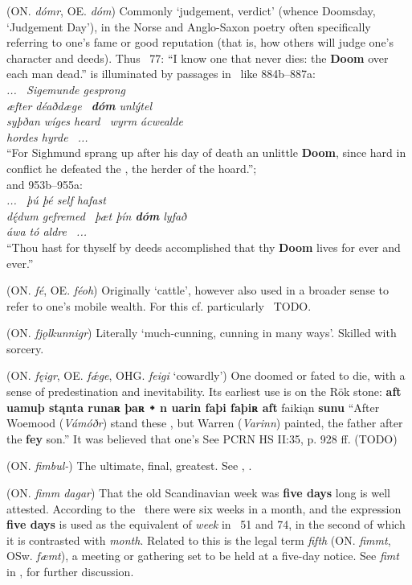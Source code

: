\begin{itemize}
 (ON. \emph{dómr}, OE. \emph{dóm})
  Commonly ‘judgement, verdict’ (whence Doomsday, ‘Judgement Day’), in the Norse and Anglo-Saxon poetry often specifically referring to one’s fame or good reputation (that is, how others will judge one’s character and deeds). Thus \Havamal\ 77: “I know one that never dies: the \textbf{Doom} over each man dead.” is illuminated by passages in \Beowulf\ like 884b–887a: \\ \emph{... \hld\ Sigemunde gesprong \\ æfter déaðdæge \hld\ \textbf{dóm} unlýtel \\ syþðan wíges heard \hld\ wyrm ácwealde \\ hordes hyrde \hld\ ...} \\ “For Sighmund sprang up after his day of death an unlittle  \textbf{Doom}, since hard in conflict he defeated the , the herder of the hoard.”; \\ and 953b–955a: \\ \emph{... \hld\ þú þé self hafast \\ dę́dum gefremed \hld\ þæt þín \textbf{dóm} lyfað \\ áwa tó aldre \hld\ ...} \\ “Thou hast for thyself by deeds accomplished that thy \textbf{Doom} lives for ever and ever.”

 (ON. \emph{fé}, OE. \emph{féoh})
  Originally ‘cattle’, however also used in a broader sense to refer to one’s mobile wealth. For this cf. particularly \Havamal\ TODO.

 (ON. \emph{fjǫlkunnigr})
  Literally ‘much-cunning, cunning in many ways’. Skilled with sorcery.

 (ON. \emph{fęigr}, OE. \emph{fǽge}, OHG. \emph{feigi} ‘cowardly’)
  One doomed or fated to die, with a sense of predestination and inevitability. Its earliest use is on the Rök stone: \textbf{aft uamuþ stąnta runaʀ þaʀ ᛭ n uarin faþi faþiʀ aft} faikiąn \textbf{sunu} “After Woemood (\emph{Vámóðr}) stand these , but Warren (\emph{Varinn}) painted, the father after the \textbf{fey} son.” It was believed that one’s See PCRN HS II:35, p. 928 ff. (TODO)

 (ON. \emph{fimbul-})
  The ultimate, final, greatest. See , .

 (ON. \emph{fimm dagar})
  That the old Scandinavian week was \textbf{five days} long is well attested. According to the \Gulatingslog\ there were six weeks in a month, and the expression \textbf{five days} is used as the equivalent of \emph{week} in \Havamal\ 51 and 74, in the second of which it is contrasted with \emph{month}. Related to this is the legal term \emph{fifth} (ON. \emph{fimmt}, OSw. \emph{fæmt}), a meeting or gathering set to be held at a five-day notice. See \emph{fimt} in \CV, \textcite{LMNL} for further discussion.


\end{itemize}
